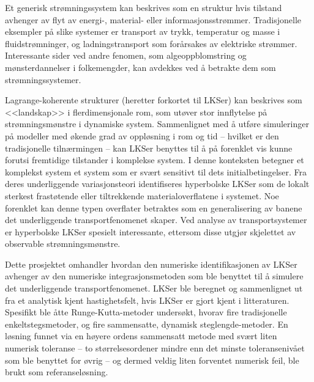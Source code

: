 Et generisk strømningssystem kan beskrives som en struktur hvis tilstand
avhenger av flyt av energi-, material- eller informasjonsstrømmer. Tradisjonelle
eksempler på slike systemer er transport av trykk, temperatur og masse i
fluidstrømninger, og ladningstransport som forårsakes av elektriske strømmer.
Interessante sider ved andre fenomen, som algeoppblomstring og mønsterdannelser
i folkemengder, kan avdekkes ved å betrakte dem som strømningssystemer.

Lagrange-koherente strukturer (heretter forkortet til LKSer) kan beskrives som
<<landskap>> i flerdimensjonale rom, som utøver stor innflytelse på
strømningsmønstre i dynamiske system.
Sammenlignet med å utføre simuleringer på modeller med økende grad av oppløsning
i rom og tid -- hvilket er den tradisjonelle tilnærmingen -- kan LKSer benyttes
til å på forenklet vis kunne forutsi fremtidige tilstander i komplekse system.
I denne konteksten betegner et komplekst system et system som er svært sensitivt
til dets initialbetingelser.
Fra deres underliggende variasjonsteori identifiseres hyperbolske LKSer som de
lokalt sterkest frastøtende eller tiltrekkende materialoverflatene i systemet.
Noe forenklet kan denne typen overflater betraktes som en generalisering av
banene det underliggende transportfenomenet skaper. Ved analyse av
transportsystemer er hyperbolske LKSer spesielt interessante, ettersom disse
utgjør skjelettet av observable strømningsmønstre.

Dette prosjektet omhandler hvordan den numeriske identifikasjonen av LKSer
avhenger av den numeriske integrasjonsmetoden som ble benyttet til å simulere
det underliggende transportfenomenet.
LKSer ble beregnet og sammenlignet ut fra et analytisk
kjent hastighetsfelt, hvis LKSer er gjort kjent i litteraturen. Spesifikt
ble åtte Runge-Kutta-metoder undersøkt, hvorav fire tradisjonelle
enkeltstegsmetoder, og fire sammensatte, dynamisk steglengde-metoder. En
løsning funnet via en høyere ordens sammensatt metode med svært liten
numerisk toleranse -- to størrelsesordener mindre enn det minste toleransenivået
som ble benyttet for
øvrig -- og dermed veldig liten forventet numerisk feil, ble brukt som
referanseløsning.%

